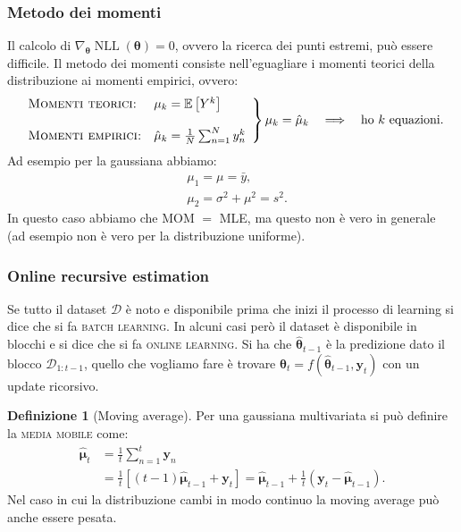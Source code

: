 \documentclass[10pt]{article}
\DeclareMathOperator{\NLL}{NLL}
\newcommand{\ve}[1]{\bm{#1}}
\newcommand{\im}[1]{\textsc{#1}}
\newcommand{\pare}[1]{
	\ensuremath{\left(#1\right)}
}
\newcommand{\spare}[1]{
	\ensuremath{\left[#1\right]}
}
\theoremstyle{definition}
\newtheorem{definition}{Definizione}[section]
\begin{document}
\subsubsection{Metodo dei momenti}
Il calcolo di $\nabla_{\ve{\theta}}\NLL\pare{\ve{\theta}} = 0$, ovvero la
ricerca dei punti estremi, può essere difficile. Il metodo dei momenti consiste
nell'eguagliare i momenti teorici della distribuzione ai momenti empirici,
ovvero:
\begin{equation}
\left.
\begin{array}{ll}
\textsc{Momenti teorici:} & \mu_k = \mathbb{E}\spare{Y^k} \\
\\
\textsc{Momenti empirici:} & \hat{\mu}_k = \frac{1}{N}\sum_{n=1}^N y_n^k
\end{array}
\right\} \mu_k = \hat{\mu}_k \quad\Longrightarrow\quad \text{ho } k \text{ equazioni}.
\end{equation}
Ad esempio per la gaussiana abbiamo:
\begin{align*}
&\mu_1 = \mu = \bar{y}, \\
&\mu_2 = \sigma^2 + \mu^2 = s^2.
\end{align*}
In questo caso abbiamo che MOM \(=\) MLE, ma questo non è vero in generale (ad
esempio non è vero per la distribuzione uniforme).

\subsubsection{Online recursive estimation}
Se tutto il dataset $\mathcal{D}$ è noto e disponibile prima che inizi il
processo di learning si dice che si fa \im{batch learning}. In alcuni casi però
il dataset è disponibile in blocchi e si dice che si fa \im{online learning}. Si
ha che $\hat{\ve{\theta}}_{t-1}$ è la predizione dato il blocco
$\mathcal{D}_{1:t-1}$, quello che vogliamo fare è trovare $\ve{\theta}_t =
f(\hat{\ve{\theta}}_{t-1}, \ve{y}_t)$ con un update ricorsivo.

\begin{definition}[Moving average]
Per una gaussiana multivariata si può definire la \im{media mobile} come:
\begin{equation}
\begin{split}
\hat{\ve{\mu}}_t &= \frac{1}{t}\sum_{n=1}^t\ve{y}_n \\
&= \frac{1}{t}\spare{\pare{t-1}\hat{\ve{\mu}}_{t-1} + \ve{y}_t} = \hat{\ve{\mu}}_{t-1} + \frac{1}{t}\pare{\ve{y}_t - \hat{\ve{\mu}}_{t-1}}.
\end{split}
\end{equation}
Nel caso in cui la distribuzione cambi in modo continuo la moving average può
anche essere pesata.
\end{definition}
\end{document}
